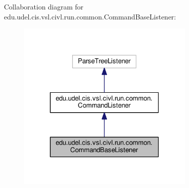Collaboration diagram for edu.\+udel.\+cis.\+vsl.\+civl.\+run.\+common.\+Command\+Base\+Listener\+:
\nopagebreak
\begin{figure}[H]
\begin{center}
\leavevmode
\includegraphics[width=243pt]{classedu_1_1udel_1_1cis_1_1vsl_1_1civl_1_1run_1_1common_1_1CommandBaseListener__coll__graph}
\end{center}
\end{figure}
